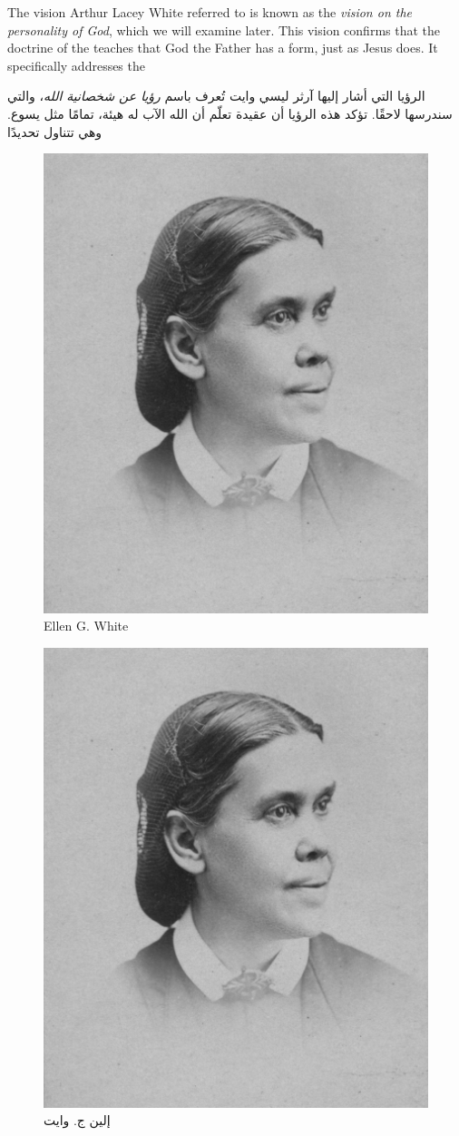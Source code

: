 The vision Arthur Lacey White referred to is known as the \textit{vision on the personality of God}, which we will examine later. This vision confirms that the doctrine of the  teaches that God the Father has a form, just as Jesus does. It specifically addresses the 


الرؤيا التي أشار إليها آرثر ليسي وايت تُعرف باسم \textit{رؤيا عن شخصانية الله}، والتي سندرسها لاحقًا. تؤكد هذه الرؤيا أن عقيدة  تعلّم أن الله الآب له هيئة، تمامًا مثل يسوع. وهي تتناول تحديدًا 


\begin{figure}[t]
    \centering
    \includegraphics[width=0.65\linewidth]{images/ellen-white.jpg}
    \caption*{Ellen G. White}
    \label{fig:ellen-g-white}
\end{figure}


\begin{figure}[t]
    \centering
    \includegraphics[width=0.65\linewidth]{images/ellen-white.jpg}
    \caption*{إلين ج. وايت}
    \label{fig:ellen-g-white}
\end{figure}


